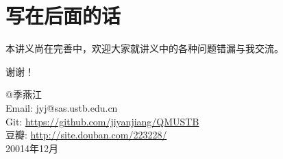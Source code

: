 \section*{写在后面的话}

本讲义尚在完善中，欢迎大家就讲义中的各种问题错漏与我交流。

谢谢！

\noindent
@季燕江\\

Email: jyj@sas.ustb.edu.cn\\
Git: \url{https://github.com/jiyanjiang/QMUSTB}\\
豆瓣: \url{http://site.douban.com/223228/}\\

20014年12月